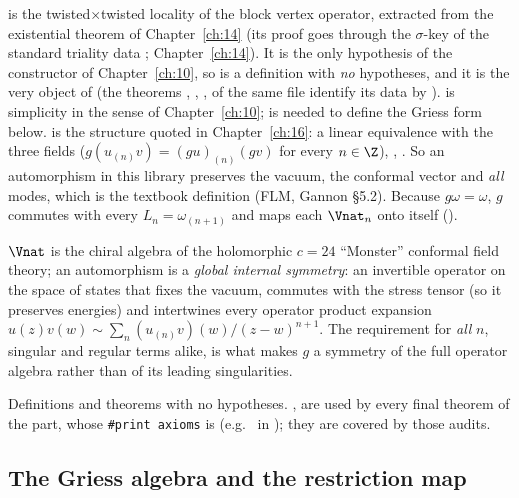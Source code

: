\begin{dictionary}
 is the twisted$\times$twisted locality of the block vertex operator, extracted from the
existential theorem  of Chapter~\ref{ch:14} (its proof goes through the $\sigma$-key
 of the standard triality data ; Chapter~\ref{ch:14}).  It is the only hypothesis of
the constructor  of Chapter~\ref{ch:10}, so  is a definition with \emph{no} hypotheses,
and it is the very object of  (the theorems , ,
,  of the same file identify its data by ).
 is simplicity in the sense of Chapter~\ref{ch:10};  is needed to
define the Griess form below.   is the structure  quoted in Chapter~\ref{ch:16}: a
linear equivalence with the three fields  ($g(u_{(n)}v)=(gu)_{(n)}(gv)$ for every $n\in\Z$),
, .  So an automorphism in this library preserves the vacuum, the conformal vector and
\emph{all} modes, which is the textbook definition (FLM, Gannon \S5.2).  Because $g\omega=\omega$, $g$ commutes
with every $L_n=\omega_{(n+1)}$ and maps each $\Vnat_n$ onto itself ().
\end{dictionary}
\begin{physics}
$\Vnat$ is the chiral algebra of the holomorphic $c=24$ ``Monster'' conformal field theory; an automorphism is a
\emph{global internal symmetry}: an invertible operator on the space of states that fixes the vacuum, commutes with
the stress tensor (so it preserves energies) and intertwines every operator product expansion
$u(z)v(w)\sim\sum_n (u_{(n)}v)(w)/(z-w)^{n+1}$.  The requirement for \emph{all} $n$, singular and regular terms alike,
is what makes $g$ a symmetry of the full operator algebra rather than of its leading singularities.
\end{physics}
\begin{status}
Definitions and theorems with no hypotheses.  ,  are used by every final theorem of the
part, whose \texttt{\#print axioms} is  (e.g.\  in
); they are covered by those audits.
\end{status}

\subsection{The Griess algebra and the restriction map}

